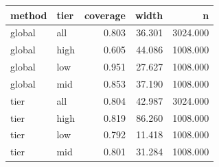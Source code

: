 \begin{tabular}{llrrr}
\toprule
method & tier & coverage & width & n \\
\midrule
global & all & 0.803 & 36.301 & 3024.000 \\
global & high & 0.605 & 44.086 & 1008.000 \\
global & low & 0.951 & 27.627 & 1008.000 \\
global & mid & 0.853 & 37.190 & 1008.000 \\
tier & all & 0.804 & 42.987 & 3024.000 \\
tier & high & 0.819 & 86.260 & 1008.000 \\
tier & low & 0.792 & 11.418 & 1008.000 \\
tier & mid & 0.801 & 31.284 & 1008.000 \\
\bottomrule
\end{tabular}
